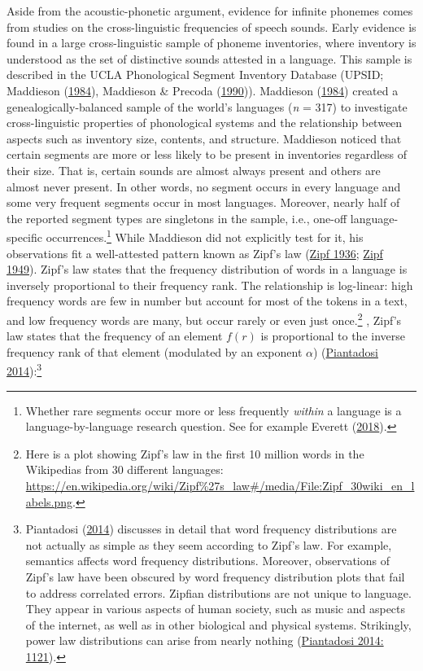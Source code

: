 \documentclass[
]{article}
\begin{document}
Aside from the acoustic-phonetic argument, evidence for infinite
phonemes comes from studies on the cross-linguistic frequencies of
speech sounds. Early evidence is found in a large cross-linguistic
sample of phoneme inventories, where inventory is understood as the set
of distinctive sounds attested in a language. This sample is described
in the UCLA Phonological Segment Inventory Database (UPSID; Maddieson
(\protect\hyperlink{ref-Maddieson1984}{1984}), Maddieson \& Precoda
(\protect\hyperlink{ref-MaddiesonPrecoda1990}{1990})). Maddieson
(\protect\hyperlink{ref-Maddieson1984}{1984}) created a
genealogically-balanced sample of the world's languages (\emph{n} = 317)
to investigate cross-linguistic properties of phonological systems and
the relationship between aspects such as inventory size, contents, and
structure. Maddieson noticed that certain segments are more or less
likely to be present in inventories regardless of their size. That is,
certain sounds are almost always present and others are almost never
present. In other words, no segment occurs in every language and some
very frequent segments occur in most languages. Moreover, nearly half of
the reported segment types are singletons in the sample, i.e., one-off
language-specific occurrences.\footnote{Whether rare segments occur more
  or less frequently \emph{within} a language is a language-by-language
  research question. See for example Everett
  (\protect\hyperlink{ref-Everett2018}{2018}).} While Maddieson did not
explicitly test for it, his observations fit a well-attested pattern
known as Zipf's law (\protect\hyperlink{ref-Zipf1936}{Zipf 1936};
\protect\hyperlink{ref-Zipf1949}{Zipf 1949}). Zipf's law states that the
frequency distribution of words in a language is inversely proportional
to their frequency rank. The relationship is log-linear: high frequency
words are few in number but account for most of the tokens in a text,
and low frequency words are many, but occur rarely or even just
once.\footnote{Here is a plot showing Zipf's law in the first 10 million
  words in the Wikipedias from 30 different languages:
  \url{https://en.wikipedia.org/wiki/Zipf\%27s_law\#/media/File:Zipf_30wiki_en_labels.png}.}
, Zipf's law states that the frequency of an element \(f(r)\) is
proportional to the inverse frequency rank of that element (modulated by
an exponent \(\alpha\))
(\protect\hyperlink{ref-Piantadosi2014}{Piantadosi 2014}):\footnote{Piantadosi
  (\protect\hyperlink{ref-Piantadosi2014}{2014}) discusses in detail
  that word frequency distributions are not actually as simple as they
  seem according to Zipf's law. For example, semantics affects word
  frequency distributions. Moreover, observations of Zipf's law have
  been obscured by word frequency distribution plots that fail to
  address correlated errors. Zipfian distributions are not unique to
  language. They appear in various aspects of human society, such as
  music and aspects of the internet, as well as in other biological and
  physical systems. Strikingly, power law distributions can arise from
  nearly nothing (\protect\hyperlink{ref-Piantadosi2014}{Piantadosi
  2014: 1121}).}
\end{document}
